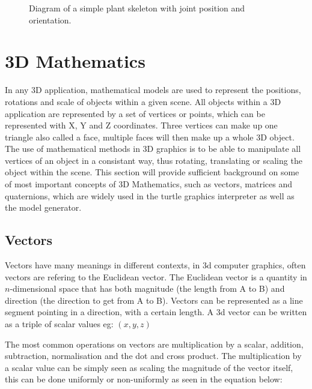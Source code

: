 \begin{figure}[htbp]
	{\centering
		\vspace{7px}
		\setlength{\fboxrule}{1pt}
		\caption{Diagram of a simple plant skeleton with joint position and orientation.} \label{skeleton diagram}
	}
\end{figure}
\FloatBarrier


\section{3D Mathematics}

In any 3D application, mathematical models are used to represent the positions, rotations and scale of objects within a given scene. All objects within a 3D application are represented by a set of vertices or points, which can be represented with X, Y and Z coordinates. Three vertices can make up one triangle also called a face, multiple faces will then make up a whole 3D object. The use of mathematical methods in 3D graphics is to be able to manipulate all vertices of an object in a consistant way, thus rotating, translating or scaling the object within the scene. This section will provide sufficient background on some of most important concepts of 3D Mathematics, such as vectors, matrices and quaternions, which are widely used in the turtle graphics interpreter as well as the model generator.

\subsection{Vectors}

Vectors have many meanings in different contexts, in \acrshort{3d} computer graphics, often vectors are refering to the Euclidean vector. The Euclidean vector is a quantity in $n$-dimensional space that has both magnitude (the length from A to B) and direction (the direction to get from A to B). Vectors can be represented as a line segment pointing in a direction, with a certain length. A \acrshort{3d} vector can be written as a triple of scalar values eg: $(x, y, z)$

The most common operations on vectors are multiplication by a scalar, addition, subtraction, normalisation and the dot and cross product. The multiplication by a scalar value can be simply seen as scaling the magnitude of the vector itself, this can be done uniformly or non-uniformly as seen in the equation below:

